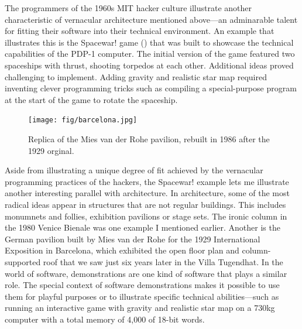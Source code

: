 The programmers of the 1960s MIT hacker culture illustrate another characteristic of
vernacular architecture mentioned above---an adminarable talent for fitting their software
into their technical environment. An example that illustrates this is the Spacewar! game
() that was built to showcase the technical capabilities of the
PDP-1 computer. The initial version of the game featured two spaceships with thrust, shooting
torpedos at each other. Additional ideas proved challenging to implement. Adding gravity and
realistic star map required inventing clever programming tricks such as compiling a special-purpose
program at the start of the game to rotate the spaceship.

\begin{figure}
  \centering
  \texttt{[image: fig/barcelona.jpg]}
  \caption{Replica of the Mies van der Rohe pavilion, rebuilt in 1986 after the 1929 orginal.}
  \label{fig:spacewar}
\end{figure}

Aside from illustrating a unique degree of fit achieved by the vernacular programming practices
of the hackers, the Spacewar! example lets me illustrate another interesting parallel with
architecture. In architecture, some of the most radical ideas appear in structures that are not
regular buildings. This includes monumnets and follies, exhibition pavilions or stage sets.
The ironic column in the 1980 Venice Bienale was one example I mentioned earlier. Another is
the German pavilion built by Mies van der Rohe for the 1929 International Exposition in Barcelona,
which exhibited the open floor plan and column-supported roof that we saw just six years later
in the Villa Tugendhat. In the world of software, demonstrations are one kind of software that plays a similar role.
The special context of software demonstrations makes it possible to use them for playful purposes
or to illustrate specific technical abilities---such as running an interactive game with gravity
and realistic star map on a 730kg computer with a total memory of 4,000 of 18-bit words.

